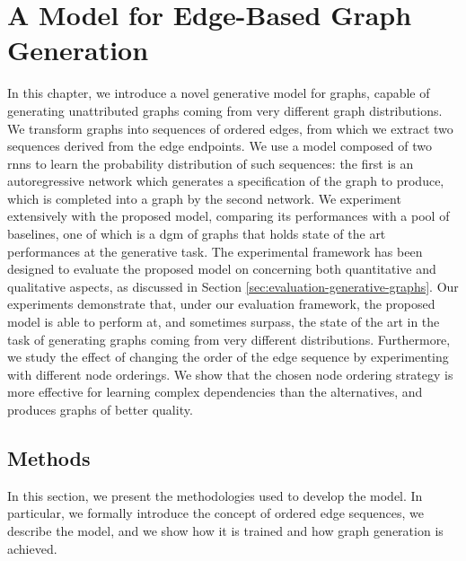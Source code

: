 \chapter{A Model for Edge-Based Graph Generation} %
\label{ch:deep-generative-learning-graphs}
In this chapter, we introduce a novel generative model for graphs, capable of generating unattributed graphs coming from very different graph distributions. We transform graphs into sequences of ordered edges, from which we extract two sequences derived from the edge endpoints. We use a model composed of two \glspl{rnn} to learn the probability distribution of such sequences: the first is an autoregressive network which generates a specification of the graph to produce, which is completed into a graph by the second network. We experiment extensively with the proposed model, comparing its performances with a pool of baselines, one of which is a \gls{dgm} of graphs that holds state of the art performances at the generative task. The experimental framework has been designed to evaluate the proposed model on concerning both quantitative and qualitative aspects, as discussed in Section \ref{sec:evaluation-generative-graphs}. Our experiments demonstrate that, under our evaluation framework, the proposed model is able to perform at, and sometimes surpass, the state of the art in the task of generating graphs coming from very different distributions. Furthermore, we study the effect of changing the order of the edge sequence by experimenting with different node orderings. We show that the chosen node ordering strategy  is more effective for learning complex dependencies than the alternatives, and produces graphs of better quality.

\section{Methods}
In this section, we present the methodologies used to develop the model. In particular, we formally introduce the concept of ordered edge sequences, we describe the model, and we show how it is trained and how graph generation is achieved.


